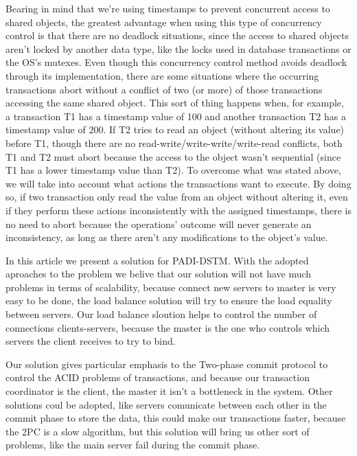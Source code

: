 \documentclass[times, 10pt,twocolumn]{article}
\begin{document}
Bearing in mind that we're using timestamps to prevent concurrent access to shared objects, the greatest advantage when using this type of concurrency control is that there are no deadlock situations, since the access to shared objects aren't locked by another data type, like the locks used in database transactions or the OS's mutexes.
Even though this concurrency control method avoids deadlock through its implementation, there are some situations where the occurring transactions abort without a conflict of two (or more) of those transactions accessing the same shared object. This sort of thing happens when, for example, a transaction T1 has a timestamp value of 100 and another transaction T2 has a timestamp value of 200. If T2 tries to read an object (without altering its value) before T1, though there are no read-write/write-write/write-read conflicts, both T1 and T2 must abort because the access to the object wasn't sequential (since T1 has a lower timestamp value than T2).
To overcome what was stated above, we will take into account what actions the transactions want to execute. By doing so, if two transaction only read the value from an object without altering it, even if they perform these actions inconsistently with the assigned timestamps, there is no need to abort because the operations' outcome will never generate an inconsistency, as long as there aren't any modifications to the object's value.


In this article we present a solution for PADI-DSTM. With the adopted aproaches to the problem we belive that our solution will not have much problems in terms of scalability, because connect new servers to master is very easy to be done, the load balance solution will try to ensure the load equality between servers. Our load balance sloution helps to control the number of connections clients-servers, because the master is the one who controls which servers the client receives to try to bind.

Our solution gives particular emphasis to the Two-phase commit protocol to control the ACID problems of transactions, and because our transaction coordinator is the client, the master it isn't a bottleneck in the system. Other solutions coul be adopted, like servers comunicate between each other in the commit phase to store the data, this could make our transactions faster, because the 2PC is a slow algorithm, but this solution will bring us other sort of problems, like the main server fail during the commit phase.
\end{document}
